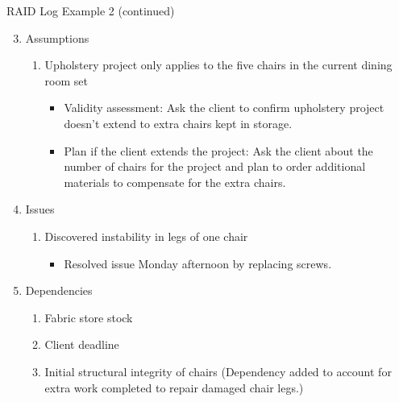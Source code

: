 \documentclass[aspectratio=169]{beamer}
\begin{document}
\begin{frame}{RAID Log Example 2 (continued)}
    \begin{enumerate}
        \setcounter{enumi}{2}
        \item Assumptions
        \begin{enumerate}
            \item Upholstery project only applies to the five chairs in the current dining room set
            \begin{itemize}
                \item Validity assessment: Ask the client to confirm upholstery project doesn't extend to extra chairs kept in storage.
                \item Plan if the client extends the project: Ask the client about the number of chairs for the project and plan to order additional materials to compensate for the extra chairs.
            \end{itemize}
        \end{enumerate}
        \item Issues
        \begin{enumerate}
            \item Discovered instability in legs of one chair
            \begin{itemize}
                \item Resolved issue Monday afternoon by replacing screws.
            \end{itemize}
        \end{enumerate}
        \item Dependencies
        \begin{enumerate}
            \item Fabric store stock
            \item Client deadline
            \item Initial structural integrity of chairs
            (Dependency added to account for extra work completed to repair damaged chair legs.)
        \end{enumerate}
    \end{enumerate}
\end{frame}
\end{document}
